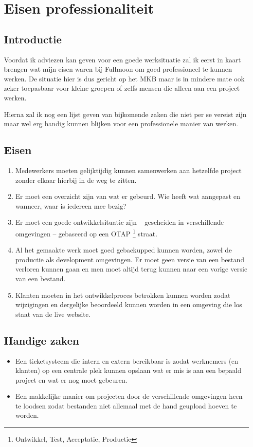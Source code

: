 \chapter{Eisen professionaliteit}

\section{Introductie}

Voordat ik adviezen kan geven voor een goede werksituatie zal ik eerst in kaart brengen wat mijn eisen waren bij Fullmoon om goed professioneel te kunnen werken. De situatie hier is dus gericht op het MKB maar is in mindere mate ook zeker toepasbaar voor kleine groepen of zelfs mensen die alleen aan een project werken.

Hierna zal ik nog een lijst geven van bijkomende zaken die niet per se vereist zijn maar wel erg handig kunnen blijken voor een professionele manier van werken.

\section{Eisen}

\begin{enumerate}
  \item Medewerkers moeten gelijktijdig kunnen samenwerken aan hetzelfde project zonder elkaar hierbij in de weg te zitten.
  \item Er moet een overzicht zijn van wat er gebeurd. Wie heeft wat aangepast en wanneer, waar is iedereen mee bezig?
  \item Er moet een goede ontwikkelsituatie zijn -- gescheiden in verschillende omgevingen -- gebaseerd op een OTAP \footnote{Ontwikkel, Test, Acceptatie, Productie} straat.
  \item Al het gemaakte werk moet goed gebackupped kunnen worden, zowel de productie als development omgevingen. Er moet geen versie van een bestand verloren kunnen gaan en men moet altijd terug kunnen naar een vorige versie van een bestand.
  \item Klanten moeten in het ontwikkelproces betrokken kunnen worden zodat wijzigingen en dergelijke beoordeeld kunnen worden in een omgeving die los staat van de live website.
\end{enumerate}

\section{Handige zaken}

\begin{itemize}
  \item Een ticketsysteem die intern en extern bereikbaar is zodat werknemers (en klanten) op een centrale plek kunnen opslaan wat er mis is aan een bepaald project en wat er nog moet gebeuren.
  \item Een makkelijke manier om projecten door de verschillende omgevingen heen te loodsen zodat bestanden niet allemaal met de hand geupload hoeven te worden.
\end{itemize}
